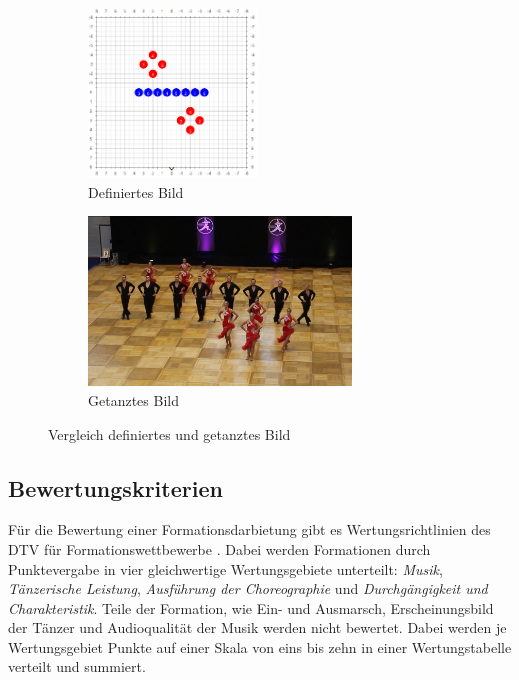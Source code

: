 \documentclass[
  ngerman,
  a4paper,  %
  twoside,  %
  bibliography=totoc,
  headsepline,
  cleardoublepage=empty,
  parskip=half,
  draft=false
]{scrbook}
\begin{document}

\begin{figure}
  \begin{subfigure}{.5\textwidth}
    \includegraphics[height=4.5cm]{graphics/definiertes_Bild.png}
    \caption{Definiertes Bild}
    \label{fig:tanzfläche_choreo}
  \end{subfigure}
  \begin{subfigure}{.5\textwidth}
    \includegraphics[height=4.5cm]{graphics/getanztes_bild.png}
    \caption{Getanztes Bild}
  \end{subfigure}
  \caption{Vergleich definiertes und getanztes Bild}
  \label{fig:def_bild}
\end{figure}


\subsection{Bewertungskriterien}
Für die Bewertung einer Formationsdarbietung gibt es Wertungsrichtlinien des DTV für Formationswettbewerbe \cite{wertungsrichtlinien}.
Dabei werden Formationen durch Punktevergabe in vier gleichwertige Wertungsgebiete unterteilt: \textit{Musik}, \textit{Tänzerische Leistung}, \textit{Ausführung der Choreographie} und \textit{Durchgängigkeit und Charakteristik}.
Teile der Formation, wie Ein- und Ausmarsch, Erscheinungsbild der Tänzer und Audioqualität der Musik werden nicht bewertet.
Dabei werden je Wertungsgebiet Punkte auf einer Skala von eins bis zehn in einer Wertungstabelle verteilt und summiert.
\end{document}
